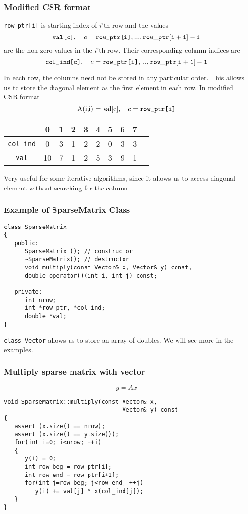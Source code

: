 \documentclass[10pt,xcolor=svgnames]{beamer}
\begin{document}
\begin{frame}
\frametitle{Modified CSR format}
{\tt row\_ptr[i]} is starting index of $i$'th row and the values
\[
\textrm{\tt val[c]}, \quad c = \textrm{\tt row\_ptr[i]}, ..., {\tt row\_ptr[i+1]-1}
\]
are the non-zero values in the $i$'th row. Their corresponding column indices are
\[
\textrm{\tt col\_ind[c]}, \quad c = \textrm{\tt row\_ptr[i]}, ..., {\tt row\_ptr[i+1]-1}
\]


In each row, the columns need not be stored in any particular order. This allows us to store the diagonal element as the first element in each row. In modified CSR format
\[
\textrm{A(i,i) = val[c]}, \quad c = \textrm{\tt row\_ptr[i]}
\]
\begin{center}
\begin{tabular}{|c|c|c||c|c||c|c|c||c|c|}
\hline
               & 0 & 1 & 2 & 3 & 4 & 5 & 6 & 7 \\
\hline
{\tt col\_ind} & 0 & 3 & 1 & 2 & 2 & 0 & 3 & 3\\
\hline
{\tt val} & 10 & 7 & 1 & 2 & 5 & 3 & 9 & 1 \\
\hline
\end{tabular}
\end{center}
Very useful for some iterative algorithms, since it allows us to access diagonal element without searching for the column.
\end{frame}
\begin{frame}[fragile]
\frametitle{Example of SparseMatrix Class}

\begin{lstlisting}
class SparseMatrix
{
   public:
      SparseMatrix (); // constructor
      ~SparseMatrix(); // destructor
      void multiply(const Vector& x, Vector& y) const;
      double operator()(int i, int j) const;

   private:
      int nrow;
      int *row_ptr, *col_ind;
      double *val;
}
\end{lstlisting}
{\tt class Vector} allows us to store an array of doubles. We will see more in the examples.
\end{frame}
\begin{frame}[fragile]
\frametitle{Multiply sparse matrix with vector}

\[
y = A x
\]

\begin{lstlisting}
void SparseMatrix::multiply(const Vector& x,
                                  Vector& y) const
{
   assert (x.size() == nrow);
   assert (x.size() == y.size());
   for(int i=0; i<nrow; ++i)
   {
      y(i) = 0;
      int row_beg = row_ptr[i];
      int row_end = row_ptr[i+1];
      for(int j=row_beg; j<row_end; ++j)
         y(i) += val[j] * x(col_ind[j]);
   }
}
\end{lstlisting}

\end{frame}
\end{document}
